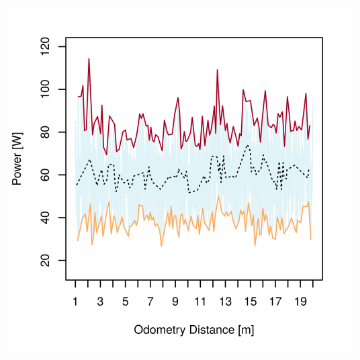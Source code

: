 \begin{figure}[h]
\captionsetup[subfigure]{justification=centering}
\vspace{-2ex}
	\centering
    \setlength{\subfigureWidth}{0.50\textwidth}
    \setlength{\graphicsHeight}{80mm}
    \hypersetup{hidelinks=true}%
    \begin{subfigure}[t]{\subfigureWidth}
        \centering
        \includegraphics[height=\graphicsHeight]{sections/locomotion-power-draws/plots/locomotion-power-draw-on-flat-terrain-1.png}
        \label{fig:plot:sub:sherpatt-flat-terrain-power-draw-1}
    \end{subfigure}\hfill
    \begin{subfigure}[t]{\subfigureWidth}
        \centering

\end{subfigure}
\end{figure}
